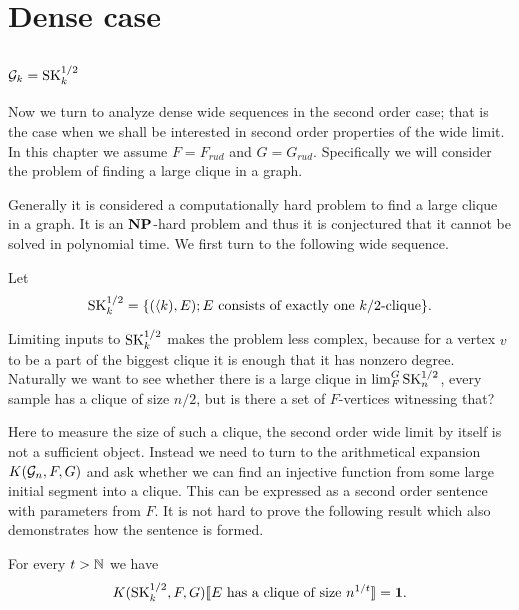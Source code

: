 \chapter{Dense case}\label{chapdense}

\section{\texorpdfstring{$\mathcal{G}_k=\text{SK}_k^{1/2}$}{Gk=SKk1/2}}

Now we turn to analyze dense wide sequences in the second order case; that is the case when we shall be interested in second order properties of the wide limit. In this chapter we assume $F=F_{rud}$ and $G=G_{rud}$. Specifically we will consider the problem of finding a large clique in a graph. 

Generally it is considered a computationally hard problem to find a large clique in a graph. It is an $\textbf{NP}$-hard problem and thus it is conjectured that it cannot be solved in polynomial time. We first turn to the following wide sequence.

\begin{defi}
Let \[\text{SK}_k^{1/2}=\{(\langle k),E);\text{$E$ consists of exactly one $k/2$-clique}\}.\]
\end{defi}

Limiting inputs to $\text{SK}_k^{1/2}$ makes the problem less complex, because for a vertex $v$ to be a part of the biggest clique it is enough that it has nonzero degree. Naturally we want to see whether there is a large clique in $\lim_F^G \text{SK}_n^{1/2}$, every sample has a clique of size $n/2$, but is there a set of $F$-vertices witnessing that? 

Here to measure the size of such a clique, the second order wide limit  by itself is not a sufficient object. Instead we need to turn to the arithmetical expansion $K(\mathcal{G}_n,F,G)$ and ask whether we can find an injective function from some large initial segment into a clique. This can be expressed as a second order sentence with parameters from $F$. It is not hard to prove the following result which also demonstrates how the sentence is formed.

\begin{thrm}\label{thrmsk1}For every $t>\mathbb{N}$ we have
\[K(\text{SK}_k^{1/2},F,G)[\![\text{$E$ has a clique of size $n^{1/t}$}]\!]=\textbf{1}.\]

\end{thrm}

